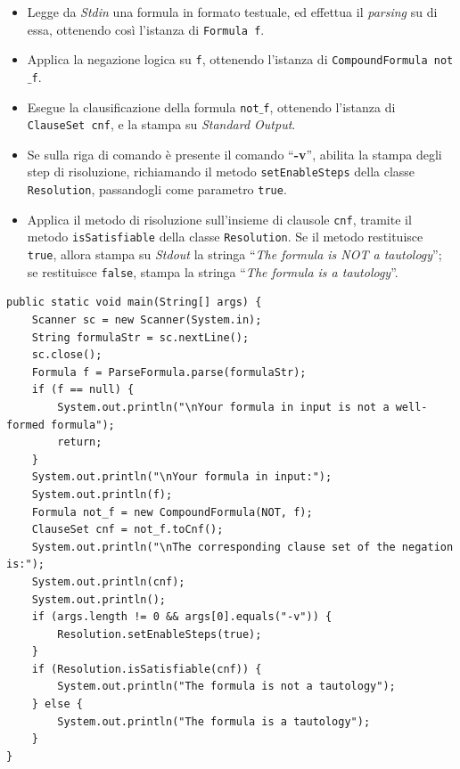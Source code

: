 \documentclass[a4paper,12pt]{report}
\begin{document}
\begin{itemize}
    \item Legge da \emph{Stdin} una formula in formato testuale, ed effettua il \emph{parsing} su di essa, ottenendo così l'istanza di \texttt{Formula f}.
    \item Applica la negazione logica su \texttt{f}, ottenendo l'istanza di \texttt{CompoundFormula not$\_$f}.
    \item Esegue la clausificazione della formula \texttt{not$\_$f}, ottenendo l'istanza di \texttt{ClauseSet cnf}, e la stampa su \emph{Standard Output}.
    \item Se sulla riga di comando è presente il comando ``\textbf{-v}'', abilita la stampa degli step di risoluzione, richiamando il metodo \texttt{setEnableSteps} della classe \texttt{Resolution}, passandogli come parametro \texttt{true}.
    \item Applica il metodo di risoluzione sull'insieme di clausole \texttt{cnf}, tramite il metodo \texttt{isSatisfiable} della classe \texttt{Resolution}. Se il metodo restituisce \texttt{true}, allora stampa su \emph{Stdout} la stringa ``\emph{The formula is NOT a tautology}''; se restituisce \texttt{false}, stampa la stringa ``\emph{The formula is a tautology}''.
\end{itemize}

\begin{minipage}{\linewidth}
    \small
    \begin{lstlisting}[caption={Metodo \texttt{main} della classe \texttt{App}}, label={method:main}]
public static void main(String[] args) {
    Scanner sc = new Scanner(System.in);
    String formulaStr = sc.nextLine();
    sc.close();
    Formula f = ParseFormula.parse(formulaStr);
    if (f == null) {
        System.out.println("\nYour formula in input is not a well-formed formula");
        return;
    }
    System.out.println("\nYour formula in input:");
    System.out.println(f);
    Formula not_f = new CompoundFormula(NOT, f);
    ClauseSet cnf = not_f.toCnf();  
    System.out.println("\nThe corresponding clause set of the negation is:");
    System.out.println(cnf);
    System.out.println();
    if (args.length != 0 && args[0].equals("-v")) {
        Resolution.setEnableSteps(true);
    }
    if (Resolution.isSatisfiable(cnf)) {
        System.out.println("The formula is not a tautology");
    } else {
        System.out.println("The formula is a tautology");
    }
}
    \end{lstlisting}
\end{minipage}
% 
% 
\end{document}
